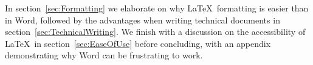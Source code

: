 In section~\ref{sec:Formatting} we elaborate on why \LaTeX\ formatting is easier than in Word, followed by the advantages when writing technical documents in section~\ref{sec:TechnicalWriting}. We finish with a discussion on the accessibility of \LaTeX\ in section~\ref{sec:EaseOfUse} before concluding, with an appendix demonstrating why Word can be frustrating to work.












